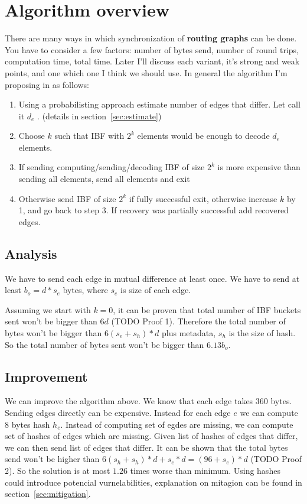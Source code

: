 \documentclass[11pt]{article}
\begin{document}
\section{Algorithm overview}
There are many ways in which synchronization of \textbf{routing graphs} can be done.
You have to consider a few factors: number of bytes send, number of round trips, computation time, total time.
Later I'll discuss each variant, it's strong and weak points, and one which one I think we should use.
In general the algorithm I'm proposing in as follows:
\begin{enumerate}
  \item Using a probabilisting approach estimate number of edges that differ. Let call it $d_e$ . (details in section~\ref{sec:estimate})
  \item Choose $k$ such that IBF with $2^k$ elements would be enough to decode $d_e$ elements.
  \item If sending computing/sending/decoding IBF of size $2^k$ is more expensive than sending all elements, send all elements and exit
  \item Otherwise send IBF of size $2^k$ if fully successful exit, otherwise increase $k$ by 1, and go back to step 3.
 If recovery was partially successful add recovered edges.
\end{enumerate}
\subsection{Analysis}
We have to send each edge in mutual difference at least once.
We have to send at least $b_o = d*s_e$ bytes, where $s_e$ is size of each edge.

Assuming we start with $k=0$, it can be proven that total number of IBF buckets sent won't be bigger than $6d$  (TODO Proof 1).
Therefore the total number of bytes won't be bigger than $6(s_e+s_h)*d$ plus metadata, $s_h$ is the size of hash.
So the total number of bytes sent won't be bigger than $6.13b_o$.
\subsection{Improvement}
We can improve the algorithm above. We know that each edge takes 360 bytes. Sending edges directly can be expensive. Instead for each edge $e$ we can compute 8 bytes hash $h_e$.
Instead of computing set of egdes are missing, we can compute set of hashes of edges which are missing. Given list of hashes of edges that differ, we can then send list of edges that differ.
It can be shown that the total bytes send won't be higher than $6(s_h+s_h)*d + s_e * d = (96+s_e)*d$ (TODO Proof 2). So the solution is at most $1.26$ times worse than minimum.
Using hashes could introduce potencial vurnelabilities, explanation on mitagion can be found in section~\ref{sec:mitigation}.
\end{document}

